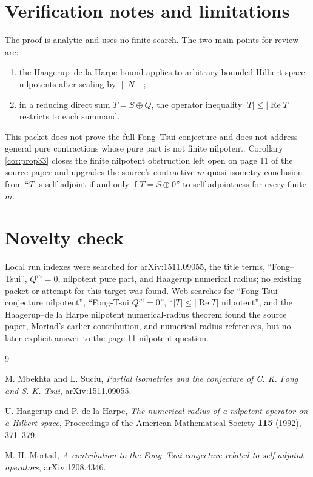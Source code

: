 \documentclass[11pt]{article}
\newcommand{\opRe}{\operatorname{Re}}
\begin{document}
\section*{Verification notes and limitations}

The proof is analytic and uses no finite search. The two main points for review
are:
\begin{enumerate}
\item the Haagerup--de la Harpe bound applies to arbitrary bounded
Hilbert-space nilpotents after scaling by \(\|N\|\);
\item in a reducing direct sum \(T=S\oplus Q\), the operator inequality
\(|T|\leq |\opRe T|\) restricts to each summand.
\end{enumerate}

This packet does not prove the full Fong--Tsui conjecture and does not address
general pure contractions whose pure part is not finite nilpotent. Corollary
\ref{cor:prop33} closes the finite nilpotent obstruction left open on page 11
of the source paper and upgrades the source's contractive \(m\)-quasi-isometry conclusion from
``\(T\) is self-adjoint if and only if \(T=S\oplus 0\)'' to self-adjointness for
every finite \(m\).

\section*{Novelty check}

Local run indexes were searched for arXiv:1511.09055, the title terms,
``Fong--Tsui'', \(Q^m=0\), nilpotent pure part, and Haagerup numerical radius;
no existing packet or attempt for this target was found. Web searches for
``Fong-Tsui conjecture nilpotent'', ``Fong-Tsui \(Q^m=0\)'',
``\(|T|\leq |\operatorname{Re}T|\) nilpotent'', and the Haagerup--de la Harpe
nilpotent numerical-radius theorem found the source paper, Mortad's earlier
contribution, and numerical-radius references, but no later explicit answer to
the page-11 nilpotent question.

\begin{thebibliography}{9}

M. Mbekhta and L. Suciu,
\emph{Partial isometries and the conjecture of C. K. Fong and S. K. Tsui},
arXiv:1511.09055.

U. Haagerup and P. de la Harpe,
\emph{The numerical radius of a nilpotent operator on a Hilbert space},
Proceedings of the American Mathematical Society \textbf{115} (1992),
371--379.

M. H. Mortad,
\emph{A contribution to the Fong--Tsui conjecture related to self-adjoint
operators}, arXiv:1208.4346.

\end{thebibliography}
\end{document}
